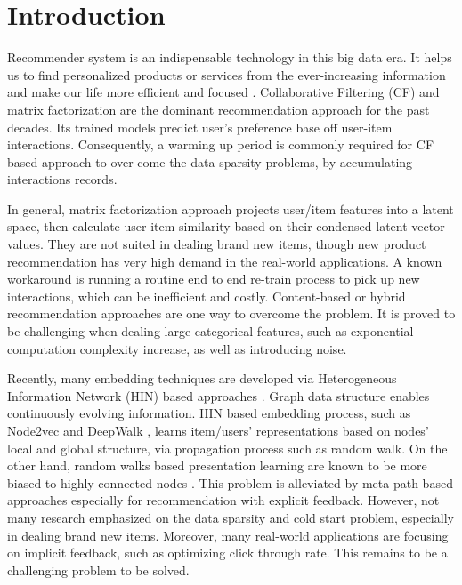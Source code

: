 \section{Introduction}

Recommender system is an indispensable technology in this big data era. It helps us to find personalized products or services from the ever-increasing information and make our life more efficient and focused \cite{lu2015recommender}. Collaborative Filtering (CF) and matrix factorization are the dominant recommendation approach for the past decades. Its trained models predict user's preference base off user-item interactions. Consequently, a warming up period is commonly required for CF based approach to over come the data sparsity problems, by accumulating interactions records.

In general, matrix factorization approach projects user/item features into a latent space, then calculate user-item similarity based on their condensed latent vector values. They are not suited in dealing brand new items, though new product recommendation has very high demand in the real-world applications. A known workaround is running a routine end to end re-train process to pick up new interactions, which can be inefficient and costly. Content-based or hybrid recommendation approaches are one way to overcome the problem. It is proved to be challenging when dealing large categorical features, such as exponential computation complexity increase, as well as introducing noise.

Recently, many embedding techniques are developed via Heterogeneous Information Network (HIN) based approaches \cite{mao2016multirelational,wang2016member}. Graph data structure enables continuously evolving information. HIN based embedding process, such as Node2vec \cite{grover2016node2vec} and DeepWalk \cite{perozzi2014deepwalk}, learns item/users' representations based on nodes' local and global structure, via propagation process such as random walk. On the other hand, random walks based presentation learning are known to be more biased to highly connected nodes \cite{sun2011pathsim}. This problem is alleviated by meta-path based approaches \cite{dong2017metapath2vec} especially for recommendation with explicit feedback. However, not many research emphasized on the data sparsity and cold start problem, especially in dealing brand new items. Moreover, many real-world applications are focusing on implicit feedback, such as optimizing click through rate. This remains to be a challenging problem to be solved.

